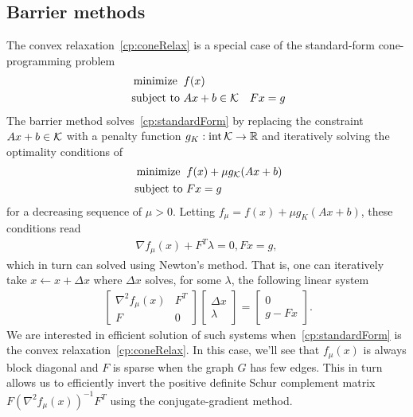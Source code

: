 \documentclass[letterpaper, 11pt]{article}
\begin{document}
\subsection{Barrier methods}
The convex relaxation~\eqref{cp:coneRelax} is a special case of the standard-form cone-programming problem
\begin{align}~\label{cp:standardForm}
  \begin{aligned}
    \operatorname*{minimize} \;\; &   f(x)\\
    \mbox{subject to } & Ax + b \in \mathcal{K}
                       & Fx = g
  \end{aligned}
\end{align}
The barrier method solves~\eqref{cp:standardForm} by
replacing the constraint $Ax + b \in \mathcal{K}$ with a penalty function  
$g_K : \operatorname*{int} \mathcal{K} \rightarrow \mathbb{R}$ and iteratively solving the optimality conditions of
\begin{align}~\label{qp:barrier}
  \begin{aligned}
    \operatorname*{minimize} \;\; &   f(x) + \mu g_{\mathcal{K}}(Ax+b) \\
    \mbox{subject to } 
                       & Fx = g
  \end{aligned}
\end{align}
for a decreasing sequence of $\mu > 0$.  
Letting $f_{\mu} = f(x) + \mu  g_K(Ax+b)$, these conditions read
\begin{align}\label{eq:barrier}
  \nabla f_{\mu}(x)+ F^T \lambda = 0, Fx = g,
\end{align}
which in turn can solved using  Newton's method. That is, one can iteratively take
$x \leftarrow x + \Delta x$ where $\Delta x$ solves, for some $\lambda$, the following linear system 
\begin{align}~\label{eq:kktsystem}
  \begin{bmatrix}
    \nabla^2 f_\mu(x)  & F^T  \\
    F  & 0 
  \end{bmatrix}
  \begin{bmatrix}
    \Delta x\\
    \lambda
  \end{bmatrix}
=
  \begin{bmatrix}
    0\\
   g - Fx
  \end{bmatrix}.
\end{align}
We are interested in efficient solution of such systems
when~\eqref{cp:standardForm} is the convex relaxation~\eqref{cp:coneRelax}.  In
this case, we'll see that  $f_\mu(x)$ is always block diagonal and $F$ is
sparse when the graph $G$ has few edges. This in turn allows us to efficiently
invert the positive definite Schur complement matrix $F (\nabla^2 f_\mu(x))^{-1} F^T$
using the conjugate-gradient method.
\end{document}
